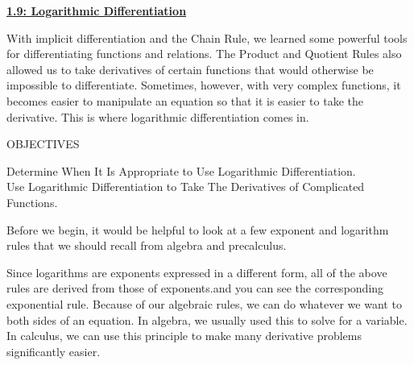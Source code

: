 \textbf{\underline{\large{1.9: Logarithmic Differentiation}}} \par

With implicit differentiation and the Chain Rule, we learned some powerful tools for differentiating functions and relations. The Product and Quotient Rules also allowed us to take derivatives of certain functions that would otherwise be impossible to differentiate. Sometimes, however, with very complex functions, it becomes easier to manipulate an equation so that it is easier to take the derivative. This is where logarithmic differentiation comes in. \par

\begin{tcolorbox}[objective]
    \begin{center}
        OBJECTIVES \\[11pt]
    \end{center}
    Determine When It Is Appropriate to Use Logarithmic Differentiation. \\
    Use Logarithmic Differentiation to Take The Derivatives of Complicated Functions.
\end{tcolorbox}

Before we begin, it would be helpful to look at a few exponent and logarithm rules that we should recall from algebra and precalculus. 

\begin{center}
\end{center}

Since logarithms are exponents expressed in a different form, all of the above rules are derived from those of exponents.and you can see the corresponding exponential rule. Because of our algebraic rules, we can do whatever we want to both sides of an equation. In algebra, we usually used this to solve for a variable. In calculus, we can use this principle to make many derivative problems significantly easier. \par

